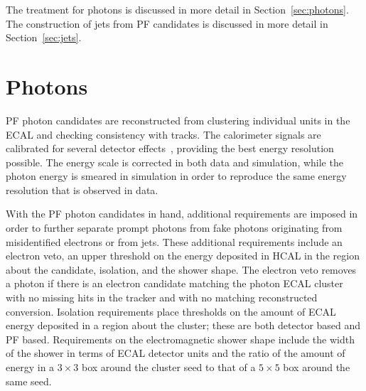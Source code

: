The treatment for photons is discussed in more detail in Section~\ref{sec:photons}. The construction
of jets from PF candidates is discussed in more detail in Section~\ref{sec:jets}. 



\section{Photons\label{sec:photons}}

PF photon candidates are reconstructed from clustering individual units in the ECAL
and checking consistency with tracks.
The calorimeter signals are calibrated for several detector effects~\cite{CMS-PAS-EGM-10-005,ECALpaper},
providing the best energy resolution possible.
The energy scale is corrected in both data and simulation, while the photon energy is smeared in
simulation in order to reproduce the same energy resolution that is observed in data.

With the PF photon candidates in hand, additional requirements are imposed in order to further
separate prompt photons from fake photons originating from misidentified electrons or from jets.
These additional requirements include an electron veto, an upper threshold on the energy deposited
in HCAL in the region about the candidate, isolation, and the shower shape. The electron veto 
removes a photon if there is an electron candidate matching the photon ECAL cluster with no missing
hits in the tracker and with no matching reconstructed conversion.
Isolation requirements place
thresholds on the amount of ECAL energy deposited in a region about the cluster; these are both
detector based and PF based. Requirements on the electromagnetic shower shape include the
width of the shower in terms of ECAL detector units and the
ratio of the amount of energy in a $3 \times 3$ box around the cluster seed to that
of a $5 \times 5$ box around the same seed.

